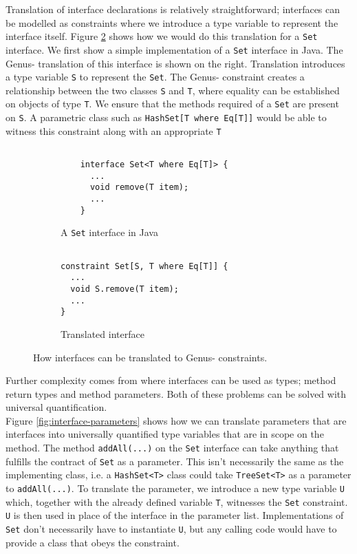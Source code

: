 Translation of interface declarations is relatively straightforward; interfaces can be modelled as constraints where we introduce a type variable to represent the interface itself. Figure \ref{fig:genus-set} shows how we would do this translation for a \texttt{Set} interface. We first show a simple implementation of a \texttt{Set} interface in Java. The Genus- translation of this interface is shown on the right. Translation introduces a type variable \texttt{S} to represent the \texttt{Set}. The Genus- constraint  creates a relationship between the two classes \texttt{S} and \texttt{T}, where equality can be established on objects of type \texttt{T}. We ensure that the methods required of a \texttt{Set} are present on \texttt{S}. A parametric class such as \texttt{HashSet[T where Eq[T]]} would be able to witness this constraint along with an appropriate \texttt{T}

\begin{figure}[h]
    \centering
    \begin{subfigure}[t]{0.45\textwidth}
        \centering
        \begin{verbatim}
        
    interface Set<T where Eq[T]> {
      ...
      void remove(T item);
      ...
    }
        \end{verbatim}
        \caption{A \texttt{Set} interface in Java}
    \end{subfigure}
    \hfill
    \begin{subfigure}[t]{0.45\textwidth}
        \centering
        \begin{verbatim}
        
constraint Set[S, T where Eq[T]] {
  ...
  void S.remove(T item);
  ...
}
        \end{verbatim}
        \caption{Translated interface}
    \label{fig:genus-set2}
    \end{subfigure}
    \caption{How interfaces can be translated to Genus- constraints.}
    \label{fig:genus-set}
\end{figure}

Further complexity comes from where interfaces can be used as types; method return types and method parameters. Both of these problems can be solved with universal quantification. \\

Figure \ref{fig:interface-parameters} shows how we can translate parameters that are interfaces into universally quantified type variables that are in scope on the method. The method \texttt{addAll(...)} on the \texttt{Set} interface can take anything that fulfills the contract of \texttt{Set} as a parameter. This isn't necessarily the same as the implementing class, i.e. a \texttt{HashSet<T>} class could take  \texttt{TreeSet<T>} as a parameter to \texttt{addAll(...)}. To translate the parameter, we introduce a new type variable \texttt{U} which, together with the already defined variable \texttt{T}, witnesses the \texttt{Set} constraint. \texttt{U} is then used in place of the interface in the parameter list. Implementations of \texttt{Set} don't necessarily have to instantiate \texttt{U}, but any calling code would have to provide a class that obeys the constraint. \\

